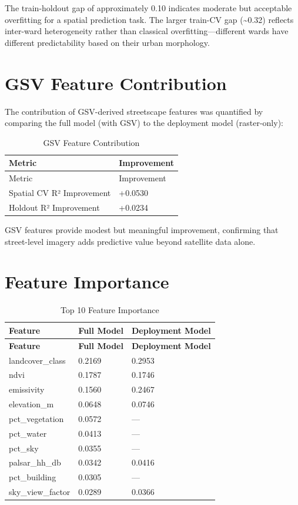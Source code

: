 \documentclass[
]{report}
\begin{document}
The train-holdout gap of approximately 0.10 indicates moderate but
acceptable overfitting for a spatial prediction task. The larger
train-CV gap (\textasciitilde0.32) reflects inter-ward heterogeneity
rather than classical overfitting---different wards have different
predictability based on their urban morphology.

\section{GSV Feature Contribution}\label{gsv-feature-contribution}

The contribution of GSV-derived streetscape features was quantified by
comparing the full model (with GSV) to the deployment model
(raster-only):

\begin{longtable}[]{@{}ll@{}}
\caption{GSV Feature Contribution}\tabularnewline
\toprule\noalign{}
Metric & Improvement \\
\midrule\noalign{}
\endfirsthead
\toprule\noalign{}
Metric & Improvement \\
\midrule\noalign{}
\endhead
\bottomrule\noalign{}
\endlastfoot
Spatial CV R² Improvement & +0.0530 \\
Holdout R² Improvement & +0.0234 \\
\end{longtable}

GSV features provide modest but meaningful improvement, confirming that
street-level imagery adds predictive value beyond satellite data alone.

\section{Feature Importance}\label{feature-importance}

\begin{longtable}[]{@{}lll@{}}
\caption{Top 10 Feature Importance}\tabularnewline
\toprule\noalign{}
\textbf{Feature} & \textbf{Full Model} & \textbf{Deployment Model} \\
\midrule\noalign{}
\endfirsthead
\toprule\noalign{}
\textbf{Feature} & \textbf{Full Model} & \textbf{Deployment Model} \\
\midrule\noalign{}
\endhead
\bottomrule\noalign{}
\endlastfoot
landcover\_class & 0.2169 & 0.2953 \\
ndvi & 0.1787 & 0.1746 \\
emissivity & 0.1560 & 0.2467 \\
elevation\_m & 0.0648 & 0.0746 \\
pct\_vegetation & 0.0572 & --- \\
pct\_water & 0.0413 & --- \\
pct\_sky & 0.0355 & --- \\
palsar\_hh\_db & 0.0342 & 0.0416 \\
pct\_building & 0.0305 & --- \\
sky\_view\_factor & 0.0289 & 0.0366 \\
\end{longtable}
\end{document}
